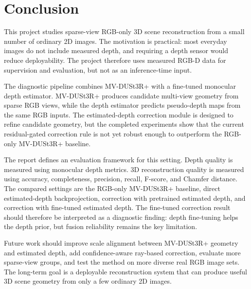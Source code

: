 \documentclass[12pt,a4paper]{article}
\newcommand{\mvdp}{MV-DUSt3R+}
\begin{document}
\section{Conclusion}
This project studies sparse-view RGB-only 3D scene reconstruction from a small number of ordinary 2D images. The motivation is practical: most everyday images do not include measured depth, and requiring a depth sensor would reduce deployability. The project therefore uses measured RGB-D data for supervision and evaluation, but not as an inference-time input.

The diagnostic pipeline combines \mvdp{} with a fine-tuned monocular depth estimator. \mvdp{} produces candidate multi-view geometry from sparse RGB views, while the depth estimator predicts pseudo-depth maps from the same RGB inputs. The estimated-depth correction module is designed to refine candidate geometry, but the completed experiments show that the current residual-gated correction rule is not yet robust enough to outperform the RGB-only \mvdp{} baseline.

The report defines an evaluation framework for this setting. Depth quality is measured using monocular depth metrics. 3D reconstruction quality is measured using accuracy, completeness, precision, recall, F-score, and Chamfer distance. The compared settings are the RGB-only \mvdp{} baseline, direct estimated-depth backprojection, correction with pretrained estimated depth, and correction with fine-tuned estimated depth. The fine-tuned correction result should therefore be interpreted as a diagnostic finding: depth fine-tuning helps the depth prior, but fusion reliability remains the key limitation.

Future work should improve scale alignment between \mvdp{} geometry and estimated depth, add confidence-aware ray-based correction, evaluate more sparse-view groups, and test the method on more diverse real RGB image sets. The long-term goal is a deployable reconstruction system that can produce useful 3D scene geometry from only a few ordinary 2D images.
\end{document}
